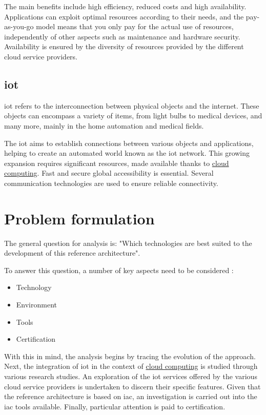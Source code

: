 The main benefits include high efficiency, reduced costs and high availability. Applications can exploit optimal resources according to their needs, and the pay-as-you-go model means that you only pay for the actual use of resources, independently of other aspects such as maintenance and hardware security. Availability is ensured by the diversity of resources provided by the different \gls{cloud} service providers.

\subsection{\acrlong{iot}}
\label{subsec:iot}
\acrfull{iot} refers to the interconnection between physical objects and the internet. These objects can encompass a variety of items, from light bulbs to medical devices, and many more, mainly in the home automation and medical fields.

The \acrshort{iot} aims to establish connections between various objects and applications, helping to create an automated world known as the \acrshort{iot} network. This growing expansion requires significant resources, made available thanks to \hyperref[subsec:cloudcomputing]{cloud computing}. Fast and secure global accessibility is essential. Several communication technologies are used to ensure reliable connectivity.


\section{Problem formulation}

The general question for analysis is: "Which technologies are best suited to the development of this reference architecture".

To answer this question, a number of key aspects need to be considered :
\begin{itemize}
    \item Technology
    \item Environment
    \item Tools
    \item Certification
\end{itemize}
With this in mind, the analysis begins by tracing the evolution of the  approach. Next, the integration of \acrshort{iot} in the context of \hyperref[subsec:cloudcomputing]{cloud computing} is studied through various research studies. An exploration of the \acrshort{iot} services offered by the various \gls{cloud} service providers is undertaken to discern their specific features. Given that the reference architecture is based on \acrfull{iac}, an investigation is carried out into the \acrshort{iac} tools available. Finally, particular attention is paid to  certification.


